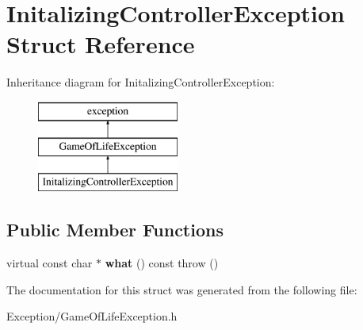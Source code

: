 \hypertarget{struct_initalizing_controller_exception}{}\section{Initalizing\+Controller\+Exception Struct Reference}
\label{struct_initalizing_controller_exception}
Inheritance diagram for Initalizing\+Controller\+Exception\+:\begin{figure}[H]
\begin{center}
\leavevmode
\includegraphics[height=3.000000cm]{struct_initalizing_controller_exception}
\end{center}
\end{figure}
\subsection*{Public Member Functions}
\begin{DoxyCompactItemize}
\item 
\hypertarget{struct_initalizing_controller_exception_a176fd0007fdeca51a4fac65f8a218ef2}{}virtual const char $\ast$ {\bfseries what} () const   throw ()\label{struct_initalizing_controller_exception_a176fd0007fdeca51a4fac65f8a218ef2}

\end{DoxyCompactItemize}


The documentation for this struct was generated from the following file\+:\begin{DoxyCompactItemize}
\item 
Exception/Game\+Of\+Life\+Exception.\+h\end{DoxyCompactItemize}
